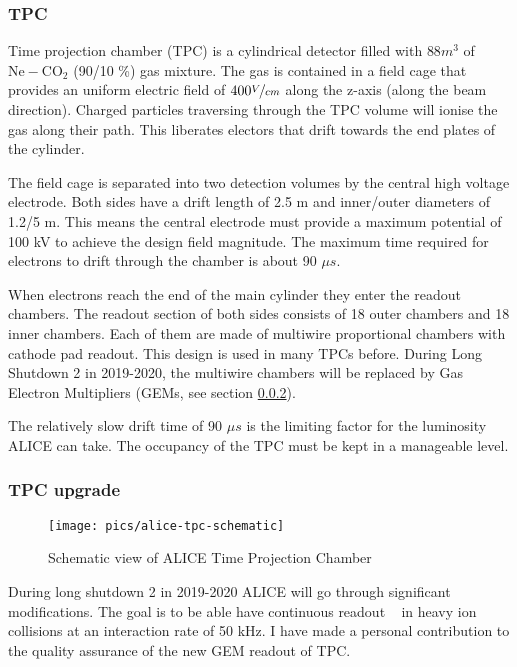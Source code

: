 \subsubsection{TPC}
\label{sec:TPC}
Time projection chamber (TPC) is a cylindrical detector filled with $ 88 m^3$ of $\mathrm{Ne-CO_2}$ (90/10 \%) gas mixture. The gas is contained in a field cage that provides an uniform electric field of $400 \nicefrac{V}{cm}$ along the z-axis (along the beam direction). Charged particles traversing through the TPC volume will ionise the gas along their path. This liberates electors that drift towards the end plates of the cylinder. 

The field cage is separated into two detection volumes by the central high voltage electrode. Both sides have a drift length of 2.5 m and inner/outer diameters of 1.2/5 m. This means the central electrode must provide a maximum potential of 100 kV to achieve the design field magnitude. The maximum time required for electrons to drift through the chamber is about 90 $\mu s$.

When electrons reach the end of the main cylinder they enter the readout chambers. The readout section of both sides consists of 18 outer chambers and 18 inner chambers. Each of them are made of multiwire proportional chambers with cathode pad readout. This design is used in many TPCs before. During Long Shutdown 2 in 2019-2020, the multiwire chambers will be replaced by Gas Electron Multipliers (GEMs, see section \ref{sec:tpcupgrade}).

The relatively slow drift time of 90 $\mu s$ is the limiting factor for the luminosity ALICE can take. The occupancy of the TPC must be kept in a manageable level. 


\subsubsection{TPC upgrade}
\label{sec:tpcupgrade}
\begin{figure}[htb]
\centering
\texttt{[image: pics/alice-tpc-schematic]}
\caption[TPC]{Schematic view of ALICE Time Projection Chamber}
\label{fig:tpc}
\end{figure}
During long shutdown 2 in 2019-2020 ALICE will go through significant modifications. The goal is to be able have continuous readout ~\cite{aliceupgrade} in heavy ion collisions at an interaction rate of 50 kHz. I have made a personal contribution to the quality assurance of the new GEM readout of TPC.

